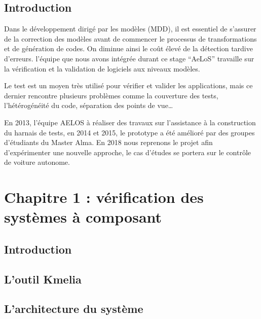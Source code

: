 \documentclass[
10pt, %
a4paper, %
oneside, %
headinclude,footinclude, %
BCOR5mm, %
]{report}
\begin{document}
  \newpage
	\section{Introduction}
	Dans le développement dirigé par les modèles (MDD), il est essentiel de s’assurer de la correction des modèles avant de commencer le processus de transformations et de génération de codes. On diminue ainsi le coût élevé de la détection tardive d’erreurs. l’équipe que nous avons intégrée durant ce stage “AeLoS” travaille sur la vérification et la validation de logiciels aux niveaux modèles.
														    
	Le test est un moyen très utilisé pour vérifier et valider les applications, mais ce dernier rencontre plusieurs problèmes comme la couverture des tests, l’hétérogénéité du code, séparation des points de vue…
														    
	En 2013, l’équipe AELOS à réaliser des travaux sur l’assistance à la construction du harnais de tests, en 2014 et 2015, le prototype a été amélioré par des groupes d’étudiants du Master Alma. En 2018 nous reprenons le projet afin d'expérimenter une nouvelle approche, le cas d'études se portera sur le contrôle de voiture autonome.
								
								  
	\newpage
	\chapter{Chapitre 1 : vérification des systèmes à composant}
	\minitoc
	\section{Introduction}
	\lipsum[5] %
	\section{L'outil Kmelia}
	\lipsum[5] %
	\section{L'architecture du système}
	\lipsum[5] %
\end{document}

